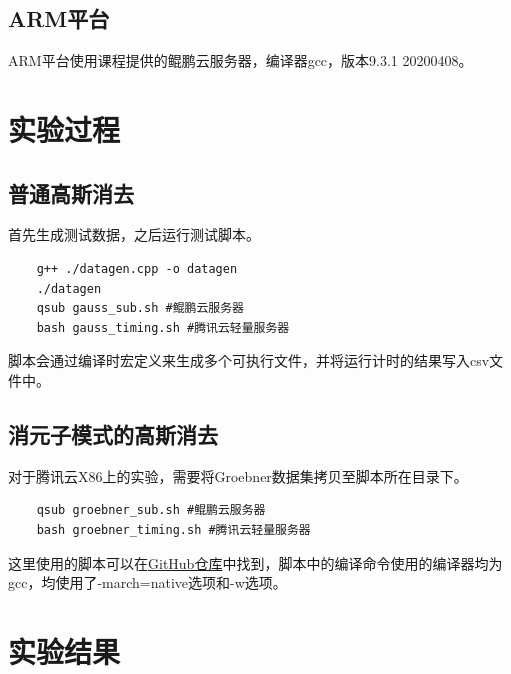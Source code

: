 \documentclass[a4paper]{article}
\begin{document}
\subsection{ARM平台}
ARM平台使用课程提供的鲲鹏云服务器，编译器gcc，版本9.3.1 20200408。



\section{实验过程}
\subsection{普通高斯消去}
首先生成测试数据，之后运行测试脚本。

\begin{verbatim}
    g++ ./datagen.cpp -o datagen
    ./datagen
    qsub gauss_sub.sh #鲲鹏云服务器
    bash gauss_timing.sh #腾讯云轻量服务器
\end{verbatim}

脚本会通过编译时宏定义来生成多个可执行文件，并将运行计时的结果写入csv文件中。

\subsection{消元子模式的高斯消去}
对于腾讯云X86上的实验，需要将Groebner数据集拷贝至脚本所在目录下。

\begin{verbatim}
    qsub groebner_sub.sh #鲲鹏云服务器
    bash groebner_timing.sh #腾讯云轻量服务器
\end{verbatim}

这里使用的脚本可以在\href{https://github.com/suhipek/NKU_parallel_programming/tree/main/3_simd}{GitHub仓库}中找到，脚本中的编译命令使用的编译器均为gcc，均使用了-march=native选项和-w选项。

\section{实验结果}
\end{document}
